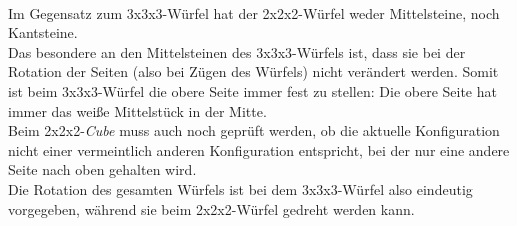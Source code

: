 \documentclass[12pt,a4paper, usenames, dvipsnames]{article}
\begin{document}
$\ $\\
Im Gegensatz zum 3x3x3-Würfel hat der 2x2x2-Würfel weder Mittelsteine, noch Kantsteine. \\
Das besondere an den Mittelsteinen des 3x3x3-Würfels ist, dass sie bei der Rotation der Seiten (also bei Zügen des Würfels) nicht verändert werden. Somit ist beim 3x3x3-Würfel die obere Seite immer fest zu stellen: Die obere Seite hat immer das weiße Mittelstück in der Mitte. \\
Beim 2x2x2-\textit{Cube} muss auch noch geprüft werden, ob die aktuelle Konfiguration nicht einer vermeintlich anderen Konfiguration entspricht, bei der nur eine andere Seite nach oben gehalten wird. \\
Die Rotation des gesamten Würfels ist bei dem 3x3x3-Würfel also eindeutig vorgegeben, während sie beim 2x2x2-Würfel gedreht werden kann. \\
\\


















\newpage
\end{document}
